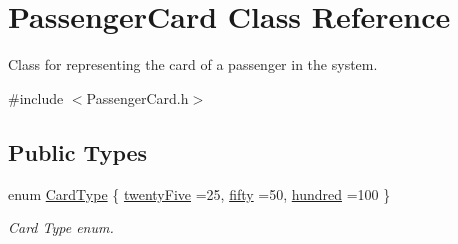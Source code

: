 \hypertarget{classPassengerCard}{}\section{Passenger\+Card Class Reference}
\label{classPassengerCard}


Class for representing the card of a passenger in the system.  




{\ttfamily \#include $<$Passenger\+Card.\+h$>$}

\subsection*{Public Types}
\begin{DoxyCompactItemize}
\item 
enum \mbox{\hyperlink{classPassengerCard_ac30388c823af514403463a797e2878af}{Card\+Type}} \{ \mbox{\hyperlink{classPassengerCard_ac30388c823af514403463a797e2878afab0b85af6d5ffb07453865fc04cae9453}{twenty\+Five}} =25, 
\mbox{\hyperlink{classPassengerCard_ac30388c823af514403463a797e2878afac443f0b05b5c1f059e4a99fef0cdea4c}{fifty}} =50, 
\mbox{\hyperlink{classPassengerCard_ac30388c823af514403463a797e2878afaa1ae2020789a526d593e7b80d4ee370d}{hundred}} =100
 \}
\begin{DoxyCompactList}\small\item\em Card Type enum. \end{DoxyCompactList}\end{DoxyCompactItemize}
